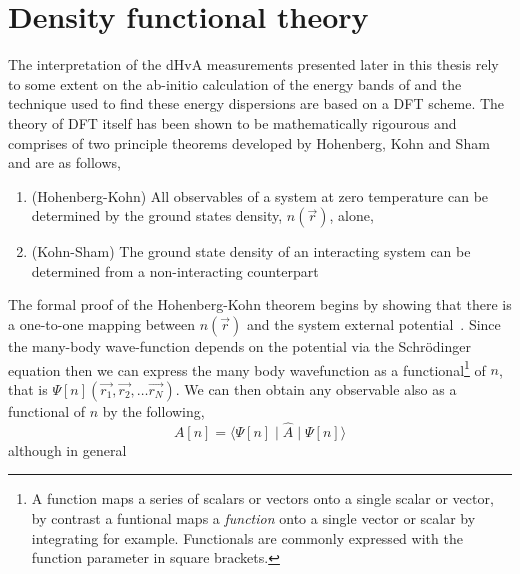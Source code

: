 
\section{Density functional theory}
\label{Sec:Theo:Dft}

The interpretation of the \ac{dHvA} measurements presented later in this thesis rely to some extent on the ab-initio calculation of the energy bands of \BaFeP and the technique used to find these energy dispersions are based on a \ac{DFT} scheme. The theory of \ac{DFT} itself has been shown to be mathematically rigourous and comprises of two principle theorems developed by Hohenberg, Kohn and Sham and are as follows,
\begin{enumerate}
    \item (Hohenberg-Kohn) All observables of a system at zero temperature can be determined by the ground states density, $n(\vec{r})$, alone,
    \item (Kohn-Sham) The ground state density of an interacting system can be determined from a non-interacting counterpart
\end{enumerate}
The formal proof of the Hohenberg-Kohn theorem begins by showing that there is a one-to-one mapping between $n(\vec{r})$ and the system external potential~\cite{Hohenberg1964}. Since the many-body wave-function depends on the potential via the Schr\"odinger equation then we can express the many body wavefunction as a functional\footnote{A function maps a series of scalars or vectors onto a single scalar or vector, by contrast a funtional maps a \textit{function} onto a single vector or scalar by integrating for example. Functionals are commonly expressed with the function parameter in square brackets.} of $n$, that is $\Psi[n](\vec{r_1}, \vec{r_2}, \ldots \vec{r_N})$. We can then obtain any observable also as a functional of $n$ by the following,
\begin{equation}
    A[n] = \langle \Psi[n]\mid\hat{A}\mid\Psi[n]\rangle
\end{equation}
although in general



